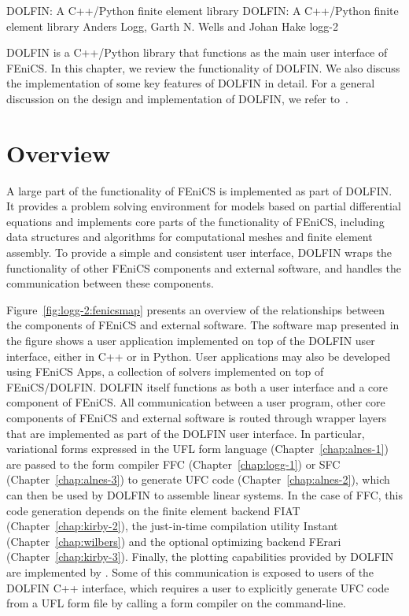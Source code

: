               {DOLFIN: A C++/Python finite element library}
              {DOLFIN: A C++/Python finite element library}
              {Anders Logg, Garth N. Wells and Johan Hake}
              {logg-2}

DOLFIN is a C++/Python library that functions as the main user
interface of FEniCS. In this chapter, we review the functionality of
DOLFIN. We also discuss the implementation of some key features of
DOLFIN in detail. For a general discussion on the design and
implementation of DOLFIN, we refer to~\citet{LoggWells2010}.

\section{Overview}

A large part of the functionality of FEniCS is implemented as part of
DOLFIN. It provides a problem solving environment for models based
on partial differential equations and implements core parts of the
functionality of FEniCS, including data structures and algorithms for
computational meshes and finite element assembly. To provide a simple
and consistent user interface, DOLFIN wraps the functionality of other
FEniCS components and external software, and handles the communication
between these components.

Figure~\ref{fig:logg-2:fenicsmap} presents an overview of
the relationships between the components of FEniCS and external
software. The software map presented in the figure shows a
user application implemented on top of the DOLFIN user interface,
either in C++ or in Python. User applications may also be developed
using FEniCS Apps, a collection of solvers implemented on top of
FEniCS/DOLFIN. DOLFIN itself functions as both a user interface and a
core component of FEniCS. All communication between a user program,
other core components of FEniCS and external software is routed
through wrapper layers that are implemented as part of the DOLFIN user
interface. In particular, variational forms expressed in the UFL form
language (Chapter~\ref{chap:alnes-1}) are passed to the form compiler
FFC (Chapter~\ref{chap:logg-1}) or SFC (Chapter~\ref{chap:alnes-3})
to generate UFC code (Chapter~\ref{chap:alnes-2}), which can then
be used by DOLFIN to assemble linear systems. In the case of FFC,
this code generation depends on the finite element backend FIAT
(Chapter~\ref{chap:kirby-2}), the just-in-time compilation utility Instant
(Chapter~\ref{chap:wilbers}) and the optional optimizing backend FErari
(Chapter~\ref{chap:kirby-3}). Finally, the plotting capabilities provided
by DOLFIN are implemented by \citet{www:viper}. Some of this communication
is exposed to users of the DOLFIN C++ interface, which requires a user
to explicitly generate UFC code from a UFL form file by calling a form
compiler on the command-line.


